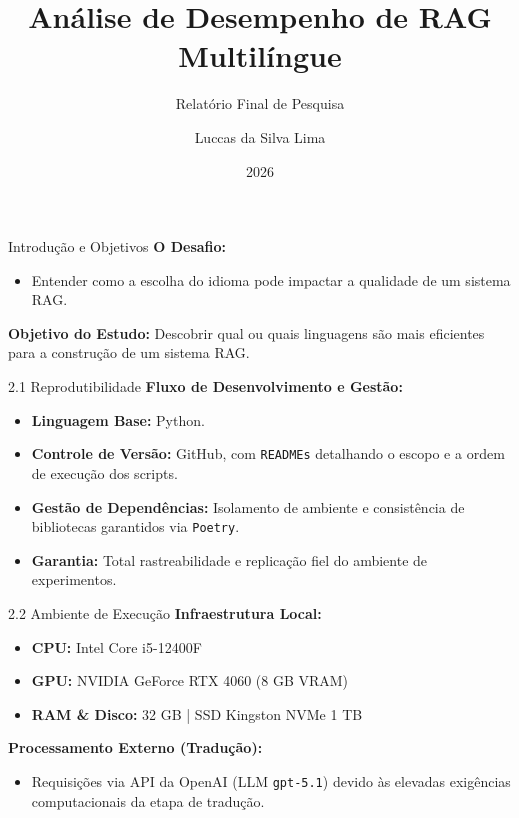 \documentclass[aspectratio=169]{beamer}
\title[Desempenho RAG Multilíngue]{Análise de Desempenho de RAG Multilíngue}
\subtitle{Relatório Final de Pesquisa}
\author{Luccas da Silva Lima}
\institute[UFRGS]{Universidade Federal do Rio Grande do Sul \and luccas.lima@ufrgs.br}
\date{2026}
\begin{document}
\begin{frame}
    \titlepage
\end{frame}

\begin{frame}{Introdução e Objetivos}
    \textbf{O Desafio:}
    \begin{itemize}
        \item Entender como a escolha do idioma pode impactar a qualidade de um sistema RAG.
    \end{itemize}
    
    \vspace{0.3cm}
    \textbf{Objetivo do Estudo:}
    Descobrir qual ou quais linguagens são mais eficientes para a construção de um sistema RAG.
\end{frame}

\begin{frame}{2.1 Reprodutibilidade}
    \textbf{Fluxo de Desenvolvimento e Gestão:}
    \begin{itemize}
        \item \textbf{Linguagem Base:} Python.
        \item \textbf{Controle de Versão:} GitHub, com \texttt{READMEs} detalhando o escopo e a ordem de execução dos scripts.
        \item \textbf{Gestão de Dependências:} Isolamento de ambiente e consistência de bibliotecas garantidos via \texttt{Poetry}.
        \item \textbf{Garantia:} Total rastreabilidade e replicação fiel do ambiente de experimentos.
    \end{itemize}
\end{frame}

\begin{frame}{2.2 Ambiente de Execução}
    \textbf{Infraestrutura Local:}
    \begin{itemize}
        \item \textbf{CPU:} Intel Core i5-12400F
        \item \textbf{GPU:} NVIDIA GeForce RTX 4060 (8 GB VRAM)
        \item \textbf{RAM \& Disco:} 32 GB | SSD Kingston NVMe 1 TB
    \end{itemize}

    \vspace{0.3cm}
    \textbf{Processamento Externo (Tradução):}
    \begin{itemize}
        \item Requisições via API da OpenAI (LLM \texttt{gpt-5.1}) devido às elevadas exigências computacionais da etapa de tradução.
    \end{itemize}
\end{frame}
\end{document}

